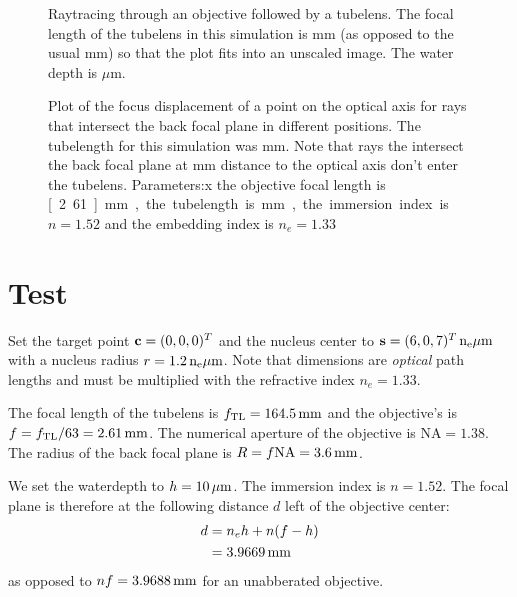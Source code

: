 \documentclass[twocolumn,DIV19]{scrartcl}
\begin{document}
\begin{figure}[!hbt]
  \centering
  \caption{Raytracing through an objective followed by a tubelens. The
    focal length of the tubelens in this simulation is \unit[16]{mm}
    (as opposed to the usual \unit[160]{mm}) so that the plot fits
    into an unscaled image. The water depth is \unit[10]{$\mu$m}.}
  \label{fig:screen_microscope-aberrate}
\end{figure}

\begin{figure}[!hbt]
  \centering
  \caption{Plot of the focus displacement of a point on the optical
    axis for rays that intersect the back focal plane in different
    positions. The tubelength for this simulation was
    \unit[160]{mm}. Note that rays the intersect the back focal plane
    at \unit[50]{mm} distance to the optical axis don't enter the
    tubelens. Parameters:x the objective focal length is
    \unit[2.61]{mm}, the tubelength is \unit[160]{mm}, the immersion
    index is $n=1.52$ and the embedding index is $n_e=1.33$ }
  \label{fig:focus-displacement}
\end{figure}
\def\NA{\textrm{NA}}
\section{Test}
Set the target point $\mathbf{c}=(0,0,0)^T$ and the nucleus center to
$\s=\unit[(6,0,7)^T]{n_e \mu m}$ with a nucleus radius
$r=\unit[1.2]{n_e \mu m}$. Note that dimensions are \emph{optical}
path lengths and must be multiplied with the refractive index
$n_e=1.33$. 

The focal length of the tubelens is $f_\textrm{TL}=\unit[164.5]{mm}$
and the objective's is $f=f_\textrm{TL}/63=\unit[2.61]{mm}$. The
numerical aperture of the objective is $\textrm{NA}=1.38$. The radius
of the back focal plane is $R=f \NA=\unit[3.6]{mm}$.

We set the waterdepth to $h=\unit[10]{\mu m}$. The immersion index is
$n=1.52$. The focal plane is therefore at the following distance $d$
left of the objective center:
\begin{align*}
  d&=n_eh+n(f-h)\\
  &=\unit[3.9669]{mm}
\end{align*}
as opposed to $nf=\unit[3.9688]{mm}$ for an unabberated objective.
\end{document}

